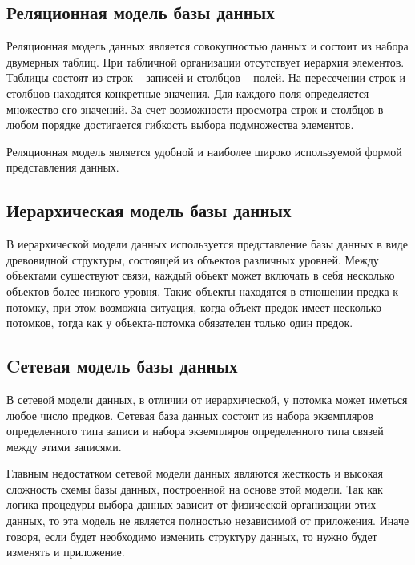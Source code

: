 \subsection{Реляционная модель базы данных}
Реляционная модель данных является совокупностью данных и состоит из набора двумерных таблиц. При табличной организации отсутствует иерархия элементов. Таблицы состоят из строк – записей и столбцов – полей. На пересечении строк и столбцов находятся конкретные значения. Для каждого поля определяется множество его значений. За счет возможности просмотра строк и столбцов в любом порядке достигается гибкость выбора подмножества элементов.

Реляционная модель является удобной и наиболее широко используемой формой представления данных.


\subsection{Иерархическая модель базы данных}
В иерархической модели данных используется представление базы данных в виде древовидной структуры, состоящей из объектов различных уровней. Между объектами существуют связи, каждый объект может включать в себя несколько объектов более низкого уровня. Такие объекты находятся в отношении предка к потомку, при этом возможна ситуация, когда объект-предок имеет несколько потомков, тогда как у объекта-потомка обязателен только один предок.


\subsection{Cетевая модель базы данных}
В сетевой модели данных, в отличии от иерархической, у потомка может иметься любое число предков. Сетевая база данных состоит из набора экземпляров определенного типа записи и набора экземпляров определенного типа связей между этими записями.

Главным недостатком сетевой модели данных являются жесткость и высокая сложность схемы базы данных, построенной на основе этой модели. Так как логика процедуры выбора данных зависит от физической организации этих данных, то эта модель не является полностью независимой от приложения. Иначе говоря, если будет необходимо изменить структуру данных, то нужно будет изменять и приложение.


